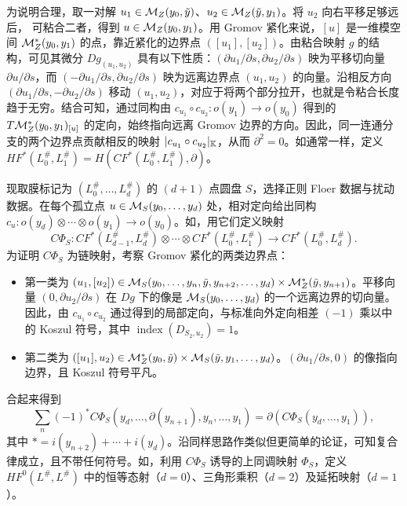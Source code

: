 为说明合理，取一对解 $u_1\in\mathcal M_Z(y_0,\allowbreak \tilde y)$、$u_2\in\mathcal M_Z(\tilde y,\allowbreak y_1)$。将 $u_2$ 向右平移足够远后，
可粘合二者，得到 $u\in\mathcal M_Z(y_0,\allowbreak y_1)$。用 Gromov 紧化来说，$[u]$ 是一维模空间 $\mathcal M_Z^*(y_0,\allowbreak y_1)$ 的点，靠近紧化的边界点 $([u_1],\allowbreak [u_2])$。由粘合映射 $g$ 的结构，可见其微分 $Dg_{(u_1,\allowbreak u_2)}$ 具有以下性质：$(\partial u_1/\partial s,\allowbreak \partial u_2/\partial s)$ 映为平移切向量 $\partial u/\partial s$，而 $(-\partial u_1/\partial s,\allowbreak \partial u_2/\partial s)$ 映为远离边界点 $(u_1,\allowbreak u_2)$ 的向量。沿相反方向 $(\partial u_1/\partial s,\allowbreak -\partial u_2/\partial s)$ 移动 $(u_1,\allowbreak u_2)$，对应于将两个部分拉开，也就是令粘合长度趋于无穷。结合可知，通过同构由 $c_{u_1}\circ c_{u_2}:o(y_1)\to o(y_0)$ 得到的 $T\mathcal M_Z^*(y_0,\allowbreak y_1)_{[u]}$ 的定向，始终指向远离 Gromov 边界的方向。因此，同一连通分支的两个边界点贡献相反的映射 $|c_{u_1}\circ c_{u_2}|_{\mathbb K}$，从而 $\partial^2=0$。如通常一样，定义 $HF^*(L_0^\#,\allowbreak L_1^\#)=H(CF^*(L_0^\#,\allowbreak L_1^\#),\allowbreak \partial)$。

现取膜标记为 $(L_0^\#,\allowbreak \ldots,\allowbreak L_d^\#)$ 的 $(d+1)$ 点圆盘 $S$，选择正则 Floer 数据与扰动数据。在每个孤立点 $u\in\mathcal M_S(y_0,\allowbreak \ldots,\allowbreak y_d)$ 处，相对定向给出同构 $c_u:o(y_d)\otimes\cdots\otimes o(y_1)\to o(y_0)$。如，用它们定义映射
\[
C\Phi_S:CF^*(L_{d-1}^\#,L_d^\#)\otimes\cdots\otimes CF^*(L_0^\#,L_1^\#)\longrightarrow CF^*(L_0^\#,L_d^\#).
\]
为证明 $C\Phi_S$ 为链映射，考察 Gromov 紧化的两类边界点：
\begin{itemize}
\item 第一类为 $(u_1,\allowbreak [u_2])\in\mathcal M_S(y_0,\allowbreak \ldots,\allowbreak y_n,\allowbreak \tilde y,\allowbreak y_{n+2},\allowbreak \ldots,\allowbreak y_d)\times\mathcal M_Z^*(\tilde y,\allowbreak y_{n+1})$。平移向量 $(0,\allowbreak \partial u_2/\partial s)$ 在 $Dg$ 下的像是 $\mathcal M_S(y_0,\allowbreak \ldots,\allowbreak y_d)$ 的一个远离边界的切向量。因此，由 $c_{u_1}\circ c_{u_2}$ 通过得到的局部定向，与标准向外定向相差 $(-1)$ 乘以中的 Koszul 符号，其中 $\operatorname{index}(D_{S_2,\allowbreak u_2})=1$。
\item 第二类为 $([u_1],\allowbreak u_2)\in\mathcal M_Z^*(y_0,\allowbreak \tilde y)\times\mathcal M_S(\tilde y,\allowbreak y_1,\allowbreak \ldots,\allowbreak y_d)$。$(\partial u_1/\partial s,\allowbreak 0)$ 的像指向边界，且 Koszul 符号平凡。
\end{itemize}
合起来得到
\begin{equation}\label{eq:12.19}
\sum_n(-1)^*C\Phi_S(y_d,\ldots,\partial(y_{n+1}),y_n,\ldots,y_1)
=\partial(C\Phi_S(y_d,\ldots,y_1)),
\end{equation}
其中 $*=i(y_{n+2})+\cdots+i(y_d)$。沿同样思路作类似但更简单的论证，可知复合律成立，且不带任何符号。如，利用 $C\Phi_S$ 诱导的上同调映射 $\Phi_S$，定义 $HF^0(L^\#,\allowbreak L^\#)$ 中的恒等态射（$d=0$）、三角形乘积（$d=2$）及延拓映射（$d=1$）。

